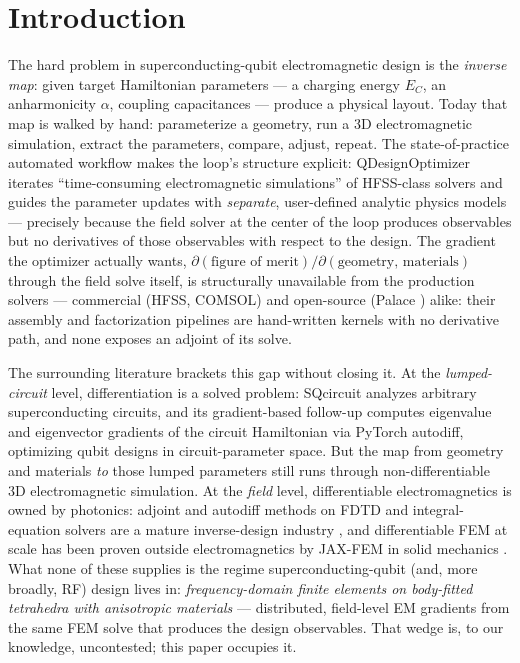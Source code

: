\documentclass{anvil-paper}
\begin{document}
\section{Introduction}
\label{sec:intro}

The hard problem in superconducting-qubit electromagnetic design is the
\emph{inverse map}: given target Hamiltonian parameters --- a charging
energy $E_C$, an anharmonicity $\alpha$, coupling capacitances --- produce
a physical layout. Today that map is walked by hand: parameterize a
geometry, run a 3D electromagnetic simulation, extract the parameters,
compare, adjust, repeat. The state-of-practice automated workflow makes
the loop's structure explicit: QDesignOptimizer
\citep{eriksson2025automated} iterates ``time-consuming electromagnetic
simulations'' of HFSS-class solvers and guides the parameter updates with
\emph{separate}, user-defined analytic physics models --- precisely
because the field solver at the center of the loop produces observables
but no derivatives of those observables with respect to the design. The
gradient the optimizer actually wants, $\partial(\text{figure of
merit})/\partial(\text{geometry, materials})$ through the field solve
itself, is structurally unavailable from the production solvers ---
commercial (HFSS, COMSOL) and open-source (Palace \citep{palace}) alike:
their assembly and factorization pipelines are hand-written kernels with
no derivative path, and none exposes an adjoint of its solve.

The surrounding literature brackets this gap without closing it. At the
\emph{lumped-circuit} level, differentiation is a solved problem:
SQcircuit \citep{rajabzadeh2023analysis} analyzes arbitrary
superconducting circuits, and its gradient-based follow-up
\citep{rajabzadeh2024general} computes eigenvalue and eigenvector
gradients of the circuit Hamiltonian via PyTorch autodiff, optimizing
qubit designs in circuit-parameter space. But the map from geometry and
materials \emph{to} those lumped parameters still runs through
non-differentiable 3D electromagnetic simulation. At the \emph{field}
level, differentiable electromagnetics is owned by photonics: adjoint and
autodiff methods on FDTD and integral-equation solvers are a mature
inverse-design industry \citep{molesky2018inverse,hughes2019forward,
hammond2022high,schubert2022inverse,mahlau2026fdtdx,ponomareva2025torchgdm},
and differentiable FEM at scale has been proven outside electromagnetics
by JAX-FEM in solid mechanics \citep{xue2023jax}. What none of these
supplies is the regime superconducting-qubit (and, more broadly, RF)
design lives in: \emph{frequency-domain finite elements on body-fitted
tetrahedra with anisotropic materials} --- distributed, field-level EM
gradients from the same FEM solve that produces the design observables.
That wedge is, to our knowledge, uncontested; this paper occupies it.
\end{document}

